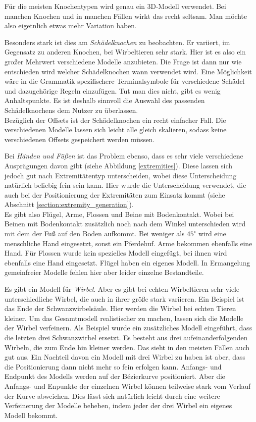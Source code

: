 Für die meisten Knochentypen wird genau ein 3D-Modell verwendet. Bei manchen Knochen und in manchen Fällen wirkt das recht seltsam. Man möchte also eigetnlich etwas mehr Variation haben.

Besonders stark ist dies am \emph{Schädelknochen} zu beobachten. Er variiert, im Gegensatz zu anderen Knochen, bei Wirbeltieren sehr stark. Hier ist es also ein großer Mehrwert verschiedene Modelle anzubieten. Die Frage ist dann nur wie entschieden wird welcher Schädelknochen wann verwendet wird. Eine Möglichkeit wäre in die Grammatik spezifischere Terminalsymbole für verschiedene Schädel und dazugehörige Regeln einzufügen. Tut man dies nicht, gibt es wenig Anhaltspunkte. Es ist deshalb sinnvoll die Auswahl des passenden Schädelknochens dem Nutzer zu überlassen.\\
Bezüglich der Offsets ist der Schädelknochen ein recht einfacher Fall. Die verschiedenen Modelle lassen sich leicht alle gleich skalieren, sodass keine verschiedenen Offsets gespeichert werden müssen.

Bei \emph{Händen und Füßen} ist das Problem ebenso, dass es sehr viele verschiedene Ausprägungen davon gibt (siehe \zb Abbildung \ref{extremities}). Diese lassen sich jedoch gut nach Extremitätentyp unterscheiden, wobei diese Unterscheidung natürlich beliebig fein sein kann. 
Hier wurde die Unterscheidung verwendet, die auch bei der Positionierung der Extremitäten zum Einsatz kommt (siehe Abschnitt \ref{section:extremity_generation}). \\
Es gibt also Flügel, Arme, Flossen und Beine mit Bodenkontakt. Wobei bei Beinen mit Bodenkontakt zusätzlich noch nach dem Winkel unterschieden wird mit dem der Fuß auf den Boden aufkommt. Bei weniger als $45^\circ$ wird eine menschliche Hand eingesetzt, sonst ein Pferdehuf. Arme bekommen ebenfalls eine Hand. Für Flossen wurde kein spezielles Modell eingefügt, bei ihnen wird ebenfalls eine Hand eingesetzt. Flügel haben ein eigenes Modell. In Ermangelung gemeinfreier Modelle fehlen hier aber leider einzelne Bestandteile.

Es gibt ein Modell für \emph{Wirbel}. Aber es gibt bei echten Wirbeltieren sehr viele unterschiedliche Wirbel, die auch in ihrer größe stark variieren. Ein Beispiel ist das Ende der Schwanzwirbelsäule. Hier werden die Wirbel bei echten Tieren kleiner.
Um das Gesamtmodell realistischer zu machen, lassen sich die Modelle der Wirbel verfeinern. Als Beispiel wurde ein zusätzliches Modell eingeführt, dass die letzten drei Schwanzwirbel ersetzt. Es besteht aus drei aufeinanderfolgenden Wirbeln, die zum Ende hin kleiner werden. Das sieht in den meisten Fällen auch gut aus. Ein Nachteil davon ein Modell mit drei Wirbel zu haben ist aber, dass die Positionierung dann nicht mehr so fein erfolgen kann. Anfangs- und Endpunkt des Modells werden auf der Bézierkurve positioniert. Aber die Anfangs- und Enpunkte der einzelnen Wirbel können teilweise stark vom Verlauf der Kurve abweichen.
Dies lässt sich natürlich leicht durch eine weitere Verfeinerung der Modelle beheben, indem jeder der drei Wirbel ein eigenes Modell bekommt.

